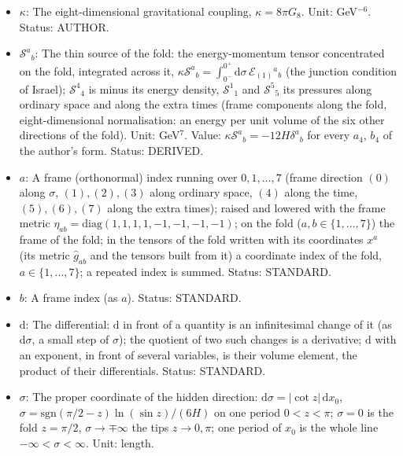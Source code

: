 \documentclass[
  10pt,
]{article}
\providecommand{\tightlist}{%
  \setlength{\itemsep}{0pt}\setlength{\parskip}{0pt}}
\begin{document}
\begin{itemize}
\tightlist
\item
  \(\kappa\): The eight-dimensional gravitational coupling,
  \(\kappa = 8\pi G_8\). Unit: GeV\(^{-6}\). Status: AUTHOR.
\item
  \(\mathcal{S}^a{}_b\): The thin source of the fold: the
  energy-momentum tensor concentrated on the fold, integrated across it,
  \(\kappa\mathcal{S}^a{}_b = \int_{0^-}^{0^+}\mathrm{d}\sigma\,\mathcal{E}_{(1)}{}^a{}_b\)
  (the junction condition of Israel); \(\mathcal{S}^4{}_4\) is minus its
  energy density, \(\mathcal{S}^1{}_1\) and \(\mathcal{S}^5{}_5\) its
  pressures along ordinary space and along the extra times (frame
  components along the fold, eight-dimensional normalisation: an energy
  per unit volume of the six other directions of the fold). Unit:
  GeV\(^7\). Value: \(\kappa\mathcal{S}^a{}_b = -12H\delta^a{}_b\) for
  every \(a_4\), \(b_4\) of the author's form. Status: DERIVED.
\item
  \(a\): A frame (orthonormal) index running over \(0, 1, \dots, 7\)
  (frame direction \((0)\) along \(\sigma\), \((1), (2), (3)\) along
  ordinary space, \((4)\) along the time, \((5), (6), (7)\) along the
  extra times); raised and lowered with the frame metric
  \(\eta_{ab} = \mathrm{diag}(1, 1, 1, 1, -1, -1, -1, -1)\); on the fold
  (\(a, b \in \{1, \dots, 7\}\)) the frame of the fold; in the tensors
  of the fold written with its coordinates \(x^a\) (its metric
  \(\hat g_{ab}\) and the tensors built from it) a coordinate index of
  the fold, \(a \in \{1, \dots, 7\}\); a repeated index is summed.
  Status: STANDARD.
\item
  \(b\): A frame index (as \(a\)). Status: STANDARD.
\item
  \(\mathrm{d}\): The differential: \(\mathrm{d}\) in front of a
  quantity is an infinitesimal change of it (as \(\mathrm{d}\sigma\), a
  small step of \(\sigma\)); the quotient of two such changes is a
  derivative; \(\mathrm{d}\) with an exponent, in front of several
  variables, is their volume element, the product of their
  differentials. Status: STANDARD.
\item
  \(\sigma\): The proper coordinate of the hidden direction:
  \(\mathrm{d}\sigma = \lvert\cot z\rvert\,\mathrm{d}x_0\),
  \(\sigma = \mathrm{sgn}(\pi/2 - z)\ln(\sin z)/(6H)\) on one period
  \(0 < z < \pi\); \(\sigma = 0\) is the fold \(z = \pi/2\),
  \(\sigma \to \mp\infty\) the tips \(z \to 0, \pi\); one period of
  \(x_0\) is the whole line \(-\infty < \sigma < \infty\). Unit: length.

\end{itemize}
\end{document}
